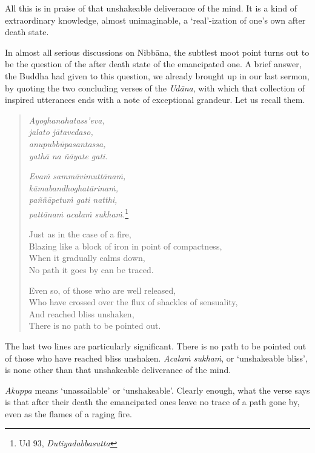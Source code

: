 All this is in praise of that unshakeable deliverance of the mind. It is a kind of extraordinary knowledge, almost unimaginable, a `real'-ization of one's own after death state.

In almost all serious discussions on Nibbāna, the subtlest moot point turns out to be the question of the after death state of the emancipated one. A brief answer, the Buddha had given to this question, we already brought up in our last sermon, by quoting the two concluding verses of the \emph{Udāna}, with which that collection of inspired utterances ends with a note of exceptional grandeur. Let us recall them.

\begin{quote}
\emph{Ayoghanahatass'eva,}\\
\emph{jalato jātavedaso,}\\
\emph{anupubbūpasantassa,}\\
\emph{yathā na ñāyate gati.}

\emph{Evaṁ sammāvimuttānaṁ,}\\
\emph{kāmabandhoghatārinaṁ,}\\
\emph{paññāpetuṁ gati natthi,}\\
\emph{pattānaṁ acalaṁ sukhaṁ.}\footnote{Ud 93, \emph{Dutiyadabbasutta}}

\clearpage

Just as in the case of a fire,\\
Blazing like a block of iron in point of compactness,\\
When it gradually calms down,\\
No path it goes by can be traced.

Even so, of those who are well released,\\
Who have crossed over the flux of shackles of sensuality,\\
And reached bliss unshaken,\\
There is no path to be pointed out.
\end{quote}

The last two lines are particularly significant. There is no path to be pointed out of those who have reached bliss unshaken. \emph{Acalaṁ sukhaṁ}, or `unshakeable bliss', is none other than that unshakeable deliverance of the mind.

\emph{Akuppa} means `unassailable' or `unshakeable'. Clearly enough, what the verse says is that after their death the emancipated ones leave no trace of a path gone by, even as the flames of a raging fire.


